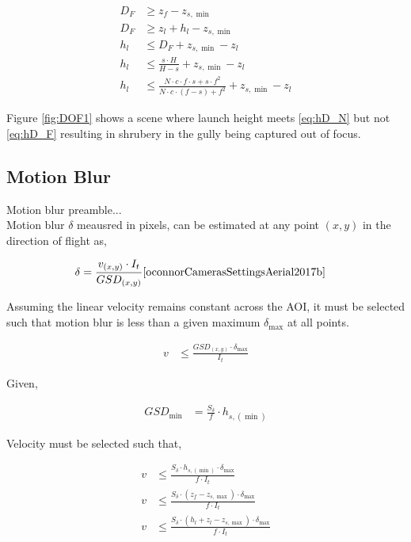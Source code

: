 \documentclass[11pt]{article}
\begin{document}
\begin{align}
    D_F &\geq z_f - z_{s,\min}\\
    D_F &\geq z_l + h_l - z_{s,\min}\\
    h_l &\leq D_F + z_{s,\min} - z_l\\
    h_l &\leq \frac{s\cdot H}{H - s} + z_{s,\min} - z_l\\
    h_l &\leq \frac{N \cdot c \cdot f \cdot s + s \cdot f^2}{N \cdot c \cdot (f-s) + f^2} + z_{s,\min} - z_l \label{eq:hD_F}
\end{align}

\noindent
Figure \ref{fig:DOF1} shows a scene where launch height meets \ref{eq:hD_N} but not \ref{eq:hD_F} resulting in shrubery in the gully being captured out of focus. 

\subsection{Motion Blur}

Motion blur preamble... \\

\noindent
Motion blur $\delta$ meausred in pixels, can be estimated at any point $(x,y)$ in the direction of flight as,

\begin{align}
    \delta &= \frac{v_{(x,y)} \cdot I_t}{GSD_{(x,y)}} \cite{oconnorCamerasSettingsAerial2017b}
\end{align}

\noindent
Assuming the linear velocity remains constant across the AOI, it must be selected such that motion blur is less than a given maximum $\delta_{\max}$ at all points. 

\begin{align}
    v &\leq \frac{GSD_{(x,y)} \cdot \delta_{\max}}{I_t} 
\end{align}

\noindent
Given,

\begin{align}
    GSD_{\min} &= \frac{S_\delta}{f} \cdot h_{s,(\min)}
\end{align}

\noindent
Velocity must be selected such that,

\begin{align}
    v &\leq \frac{ S_\delta \cdot h_{s,(\min)} \cdot \delta_{\max}}{f \cdot I_t} \\
    v &\leq \frac{ S_\delta \cdot (z_f - z_{s,\max}) \cdot \delta_{\max}}{f \cdot I_t} \\
    v &\leq \frac{ S_\delta \cdot (h_l + z_l - z_{s,\max}) \cdot \delta_{\max}}{f \cdot I_t}
\end{align}
\end{document}

